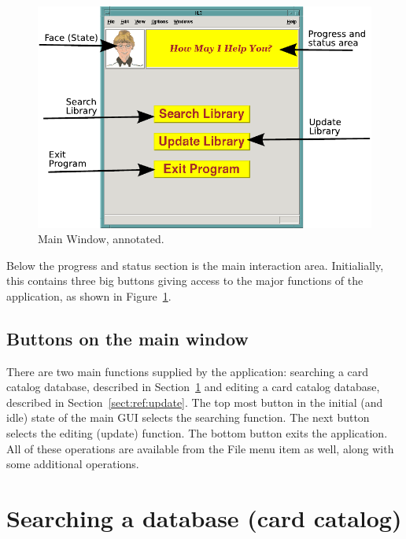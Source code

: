 \begin{figure}[hpt]
\begin{centering}
\includegraphics{MainWindowAnnotated.pdf}
\caption{Main Window, annotated.}
\label{fig:ref:mainwindowAnno}
\end{centering}
\end{figure}
Below the progress and status section is the main interaction area.
Initialially, this contains three big buttons giving access to the major
functions of the application, as shown in
Figure~\ref{fig:ref:mainwindowAnno}. 

\subsection{Buttons on the main window}

There are two main functions supplied by the application: searching a
card catalog database, described in Section~\ref{sect:ref:search} and
editing a card catalog database, described in
Section~\ref{sect:ref:update}. The top most button in the initial (and
idle) state of the main GUI selects the searching function. The next
button selects the editing (update) function. The bottom button exits
the application. All of these operations are available from the File
menu item as well, along with some additional operations.

\section{Searching a database (card catalog)}
\label{sect:ref:search}

